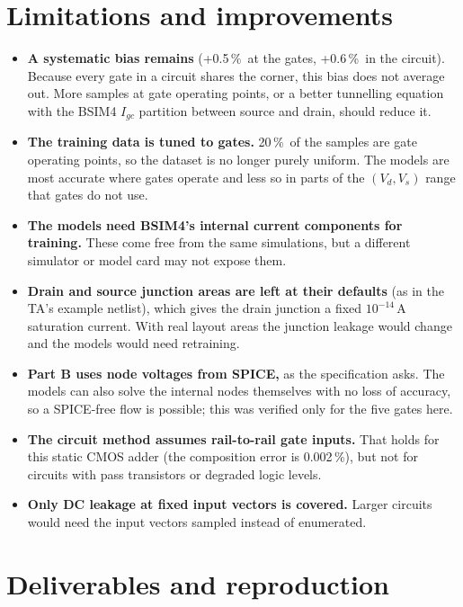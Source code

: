\documentclass[10pt]{article}
\newcommand{\pct}{\,\%}
\begin{document}
\section{Limitations and improvements}

\begin{itemize}
\item \textbf{A systematic bias remains} (+0.5\pct\ at the gates, +0.6\pct\ in the circuit).
Because every gate in a circuit shares the corner, this bias does not average out. More samples at
gate operating points, or a better tunnelling equation with the BSIM4 $I_{gc}$ partition between
source and drain, should reduce it.
\item \textbf{The training data is tuned to gates.} 20\pct\ of the samples are gate operating
points, so the dataset is no longer purely uniform. The models are most accurate where gates
operate and less so in parts of the $(V_d, V_s)$ range that gates do not use.
\item \textbf{The models need BSIM4's internal current components for training.} These come free
from the same simulations, but a different simulator or model card may not expose them.
\item \textbf{Drain and source junction areas are left at their defaults} (as in the TA's example
netlist), which gives the drain junction a fixed $10^{-14}$\,A saturation current. With real
layout areas the junction leakage would change and the models would need retraining.
\item \textbf{Part B uses node voltages from SPICE,} as the specification asks. The models can also
solve the internal nodes themselves with no loss of accuracy, so a SPICE-free flow is possible;
this was verified only for the five gates here.
\item \textbf{The circuit method assumes rail-to-rail gate inputs.} That holds for this static CMOS
adder (the composition error is 0.002\pct), but not for circuits with pass transistors or degraded
logic levels.
\item \textbf{Only DC leakage at fixed input vectors is covered.} Larger circuits would need the
input vectors sampled instead of enumerated.
\end{itemize}

\section{Deliverables and reproduction}
\end{document}
